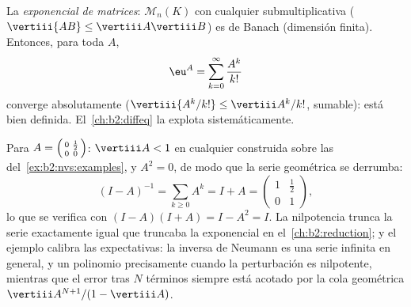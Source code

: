 \begin{example}\label{ex:b2:nvs:matrixexp}
La \emph{exponencial de matrices}:
$\mathcal{M}_n(K)$ con cualquier  submultiplicativa
($\vertiii{AB} \leq \vertiii A \vertiii B$) es de Banach (dimensión
finita). Entonces, para toda $A$,
\[
\eu^A = \sum_{k=0}^{\infty} \frac{A^k}{k!}
\]
converge absolutamente ($\vertiii{A^k/k!} \leq \vertiii A^k /k!$,
sumable): está bien definida. El~\cref{ch:b2:diffeq} la explota
sistemáticamente.
\end{example}

\begin{example}\label{ex:b2:nvs:neumannfinite}
Para $A = \begin{psmallmatrix}0 & \frac12\\ 0 &
0\end{psmallmatrix}$: $\vertiii A < 1$ en cualquier
 construida sobre las  del~\cref{ex:b2:nvs:examples}, y $A^2 = 0$, de modo que la serie
geométrica se derrumba:
\[
(I - A)^{-1} = \sum_{k \geq 0} A^k = I + A =
\begin{pmatrix}1 & \tfrac12\\ 0 & 1\end{pmatrix},
\]
lo que se verifica con $(I - A)(I + A) = I - A^2 = I$. La
nilpotencia trunca la serie exactamente igual que truncaba la
exponencial en el~\cref{ch:b2:reduction}; y el ejemplo calibra las
expectativas: la inversa de Neumann es una serie infinita en
general, y un polinomio precisamente cuando la perturbación es
nilpotente, mientras que el error tras $N$ términos siempre está
acotado por la cola geométrica $\vertiii A^{N+1}/(1 - \vertiii A)$.
\end{example}

